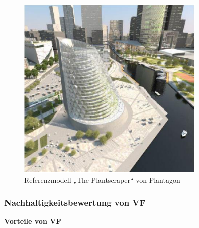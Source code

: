 \documentclass{scrartcl}
\begin{document}
\begin{figure}[htbp]
    \centering
    \includegraphics[width=9cm]{image_folder/plantscraper.png}
  \caption{Referenzmodell „The Plantscraper“ von Plantagon}
  \label{fig:plantagon_2}
\end{figure} 

\subsubsection {Nachhaltigkeitsbewertung von VF}
\textbf{Vorteile von VF}
\end{document}
